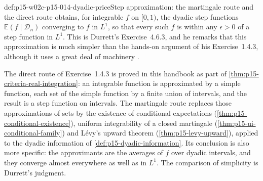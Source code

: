 \begin{hbconvention}{def:p15-w02c-p15-014-dyadic-price}{Step approximation: the martingale route and the direct route}
 obtains, for integrable \(f\) on
\([0,1)\), the dyadic step functions \(\mathbb E(f\mid\mathcal D_n)\)
converging to \(f\) in \(L^1\), so that every such \(f\) is within any
\(\epsilon>0\) of a step function in \(L^1\). This is Durrett's
Exercise~4.6.3, and he remarks that this approximation is much simpler
than the hands-on argument of his Exercise~1.4.3, although it uses a
great deal of machinery \cite[Exercise~4.6.3, p.~249]{DurrettPTEAuthor2019}.

The direct route of Exercise~1.4.3
\cite[Exercise~1.4.3, p.~24]{DurrettPTEAuthor2019} is proved in this
handbook as part of \cref{thm:p15-criteria-real-integration}: an
integrable function is approximated by a simple function, each set of
the simple function by a finite union of intervals, and the result is a
step function on intervals. The martingale route replaces those
approximations of sets by the existence of conditional expectations
(\cref{thm:p15-conditional-existence}), uniform integrability of a
closed martingale (\cref{thm:p15-ui-conditional-family}) and L\'evy's
upward theorem (\cref{thm:p15-levy-upward}), applied to the dyadic
information of \cref{def:p15-dyadic-information}. Its conclusion is
also more specific: the approximants are the averages of \(f\) over
dyadic intervals, and they converge almost everywhere as well as in
\(L^1\). The comparison of simplicity is Durrett's judgment.
\end{hbconvention}

